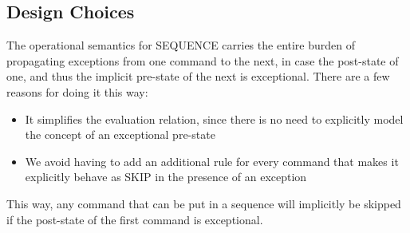 \subsection{Design Choices}
The operational semantics for SEQUENCE carries the entire burden of propagating exceptions from one command to the next, in case the post-state of one, and thus the implicit pre-state of the next is exceptional. There are a few reasons for doing it this way:

\begin{itemize}
\item It simplifies the evaluation relation, since there is no need to explicitly model the concept of an exceptional pre-state
\item We avoid having to add an additional rule for every command that makes it explicitly behave as SKIP in the presence of an exception
\end{itemize}

This way, any command that can be put in a sequence will implicitly be skipped if the post-state of the first command is exceptional.

